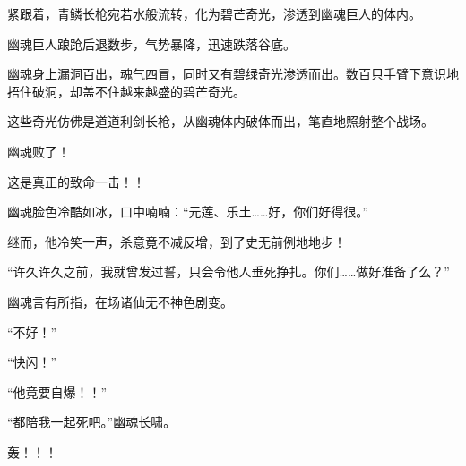 \begin{this_body}
紧跟着，青鳞长枪宛若水般流转，化为碧芒奇光，渗透到幽魂巨人的体内。

幽魂巨人踉跄后退数步，气势暴降，迅速跌落谷底。

幽魂身上漏洞百出，魂气四冒，同时又有碧绿奇光渗透而出。数百只手臂下意识地捂住破洞，却盖不住越来越盛的碧芒奇光。

这些奇光仿佛是道道利剑长枪，从幽魂体内破体而出，笔直地照射整个战场。

幽魂败了！

这是真正的致命一击！！

幽魂脸色冷酷如冰，口中喃喃：“元莲、乐土……好，你们好得很。”

继而，他冷笑一声，杀意竟不减反增，到了史无前例地地步！

“许久许久之前，我就曾发过誓，只会令他人垂死挣扎。你们……做好准备了么？”

幽魂言有所指，在场诸仙无不神色剧变。

“不好！”

“快闪！”

“他竟要自爆！！”

“都陪我一起死吧。”幽魂长啸。

轰！！！

\end{this_body}

